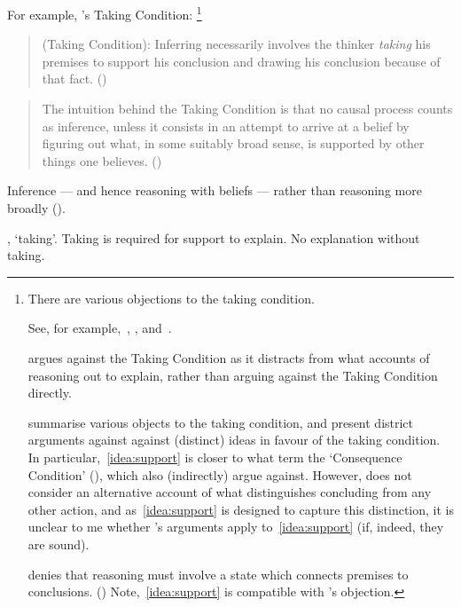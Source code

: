 \begin{note}
  For example, \citeauthor{Boghossian:2014aa}'s Taking Condition:%
  \footnote{
    There are various objections to the taking condition.

    See, for example,~\textcite{Hlobil:2014tq}, \textcite{McHugh:2016vp}, and~\textcite{Wright:2014tt}.

    \citeauthor{Hlobil:2014tq} argues against the Taking Condition as it distracts from what accounts of reasoning out to explain, rather than arguing against the Taking Condition directly.

    \citeauthor{McHugh:2016vp} summarise various objects to the taking condition, and present district arguments against against (distinct) ideas in favour of the taking condition.
    In particular,~\autoref{idea:support} is closer to what \citeauthor{McHugh:2016vp} term the `Consequence Condition' (\citeyear[cf.][316]{McHugh:2016vp}), which \citeauthor{McHugh:2016vp} also (indirectly) argue against.
    However, \citeauthor{McHugh:2016vp} does not consider an alternative account of what distinguishes concluding from any other action, and as~\autoref{idea:support} is designed to capture this distinction, it is unclear to me whether \citeauthor{McHugh:2016vp}'s arguments apply to~\autoref{idea:support} (if, indeed, they are sound).

    \citeauthor{Wright:2014tt} denies that reasoning must involve a state which connects premises to conclusions. (\citeyear[Cf.][33-34]{Wright:2014tt})
    Note,~\autoref{idea:support} is compatible with \citeauthor{Wright:2014tt}'s objection.
  }

  \begin{quote}
    (Taking Condition):
    Inferring necessarily involves the thinker \emph{taking} his premises to support his conclusion and drawing his conclusion because of that fact.%
    \mbox{}\hfill\mbox{(\Citeyear[5]{Boghossian:2014aa})}
  \end{quote}

  \begin{quote}
    The intuition behind the Taking Condition is that no causal process counts as inference, unless it consists in an attempt to arrive at a belief by figuring out what, in some suitably broad sense, is supported by other things one believes.%
    \mbox{}\hfill\mbox{(\Citeyear[5]{Boghossian:2014aa})}
  \end{quote}

  Inference --- and hence reasoning with beliefs --- rather than reasoning more broadly (\Citeyear[cf][2]{Boghossian:2014aa}).

  \citeauthor{Boghossian:2014aa}, `taking'.
  Taking is required for support to explain.
  No explanation without taking.
\end{note}

